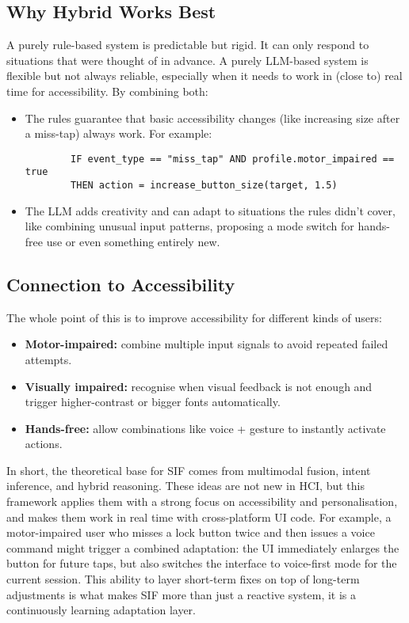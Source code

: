 \subsection{Why Hybrid Works Best}
A purely rule-based system is predictable but rigid. It can only respond to situations that were thought of in advance. A purely LLM-based system is flexible but not always reliable, especially when it needs to work in (close to) real time for accessibility.
By combining both:
\begin{itemize}
    \item The rules guarantee that basic accessibility changes (like increasing size after a miss-tap) always work. For example:
    \begin{verbatim}
        IF event_type == "miss_tap" AND profile.motor_impaired == true
        THEN action = increase_button_size(target, 1.5)
    \end{verbatim}
    \item The LLM adds creativity and can adapt to situations the rules didn’t cover, like combining unusual input patterns, proposing a mode switch for hands-free use or even something entirely new.
\end{itemize}

\subsection{Connection to Accessibility}
The whole point of this is to improve accessibility for different kinds of users:
\begin{itemize}
    \item \textbf{Motor-impaired:} combine multiple input signals to avoid repeated failed attempts.
    \item \textbf{Visually impaired:} recognise when visual feedback is not enough and trigger higher-contrast or bigger fonts automatically.
    \item \textbf{Hands-free:} allow combinations like voice + gesture to instantly activate actions.
\end{itemize}

In short, the theoretical base for SIF comes from multimodal fusion, intent inference, and hybrid reasoning. These ideas are not new in HCI, but this framework applies them with a strong focus on accessibility and personalisation, and makes them work in real time with cross-platform UI code. For example, a motor-impaired user who misses a lock button twice and then issues a voice command might trigger a combined adaptation: the UI immediately enlarges the button for future taps, but also switches the interface to voice-first mode for the current session. This ability to layer short-term fixes on top of long-term adjustments is what makes SIF more than just a reactive system, it is a continuously learning adaptation layer.

